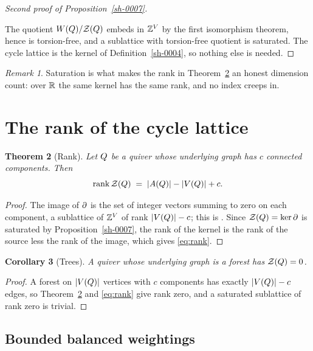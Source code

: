 \documentclass[11pt]{amsart}
\providecommand{\uses}[1]{}
\theoremstyle{plain}
\newtheorem{theorem}{Theorem}[section]
\newtheorem{corollary}[theorem]{Corollary}
\theoremstyle{definition}
\theoremstyle{remark}
\newtheorem{remark}[theorem]{Remark}
\begin{document}
\begin{proof}[Second proof of Proposition~\ref{sh-0007}]\label{sh-0010}
\uses{sh-0004}
The quotient $W(Q) / \mathcal{Z}(Q)$ embeds in $\mathbb{Z}^{V}$ by the first isomorphism theorem, hence is torsion-free, and a sublattice with torsion-free quotient is saturated. The cycle lattice is the kernel of Definition~\ref{sh-0004}, so nothing else is needed.
\end{proof}


\begin{remark}\label{sh-0008}
Saturation is what makes the rank in Theorem~\ref{sh-0009} an honest dimension count: over $\mathbb{R}$ the same kernel has the same rank, and no index creeps in.
\end{remark}


\section{The rank of the cycle lattice}\label{sh-0300}

\begin{theorem}[Rank]\label{sh-0009}
Let $Q$ be a quiver whose underlying graph has $c$ connected components. Then
\begin{equation}\label{eq:rank}
\operatorname{rank} \mathcal{Z}(Q) \;=\; |A(Q)| - |V(Q)| + c.
\end{equation}
\end{theorem}
\begin{proof}
\uses{sh-0007}
The image of $\partial$ is the set of integer vectors summing to zero on each component, a sublattice of $\mathbb{Z}^{V}$ of rank $|V(Q)| - c$; this is \cite[Proposition 2.1]{Arden24}. Since $\mathcal{Z}(Q) = \ker \partial$ is saturated by Proposition~\ref{sh-0007}, the rank of the kernel is the rank of the source less the rank of the image, which gives \eqref{eq:rank}.
\end{proof}


\begin{corollary}[Trees]\label{sh-000A}
A quiver whose underlying graph is a forest has $\mathcal{Z}(Q) = 0$.
\end{corollary}
\begin{proof}
\uses{sh-0009}
A forest on $|V(Q)|$ vertices with $c$ components has exactly $|V(Q)| - c$ edges, so Theorem~\ref{sh-0009} and \eqref{eq:rank} give rank zero, and a saturated sublattice of rank zero is trivial.
\end{proof}


\subsection{Bounded balanced weightings}\label{sh-0301}
\end{document}
